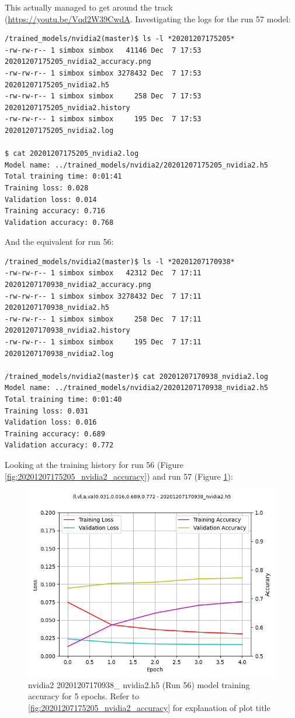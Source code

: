 This actually managed to get around the track (\url{https://youtu.be/Vqd2W39CwdA}.
Investigating the logs for the run 57 model:
\begin{verbatim}
/trained_models/nvidia2(master)$ ls -l *20201207175205*
-rw-rw-r-- 1 simbox simbox   41146 Dec  7 17:53 20201207175205_nvidia2_accuracy.png
-rw-rw-r-- 1 simbox simbox 3278432 Dec  7 17:53 20201207175205_nvidia2.h5
-rw-rw-r-- 1 simbox simbox     258 Dec  7 17:53 20201207175205_nvidia2.history
-rw-rw-r-- 1 simbox simbox     195 Dec  7 17:53 20201207175205_nvidia2.log

$ cat 20201207175205_nvidia2.log
Model name: ../trained_models/nvidia2/20201207175205_nvidia2.h5
Total training time: 0:01:41
Training loss: 0.028
Validation loss: 0.014
Training accuracy: 0.716
Validation accuracy: 0.768
\end{verbatim}
And the equivalent for run 56:
\begin{verbatim}
/trained_models/nvidia2(master)$ ls -l *20201207170938*
-rw-rw-r-- 1 simbox simbox   42312 Dec  7 17:11 20201207170938_nvidia2_accuracy.png
-rw-rw-r-- 1 simbox simbox 3278432 Dec  7 17:11 20201207170938_nvidia2.h5
-rw-rw-r-- 1 simbox simbox     258 Dec  7 17:11 20201207170938_nvidia2.history
-rw-rw-r-- 1 simbox simbox     195 Dec  7 17:11 20201207170938_nvidia2.log

/trained_models/nvidia2(master)$ cat 20201207170938_nvidia2.log
Model name: ../trained_models/nvidia2/20201207170938_nvidia2.h5
Total training time: 0:01:40
Training loss: 0.031
Validation loss: 0.016
Training accuracy: 0.689
Validation accuracy: 0.772
\end{verbatim}
Looking at the training history for run 56 (Figure \ref{fig:20201207175205_nvidia2_accuracy}) and run 57 (Figure \ref{fig:20201207170938_nvidia2_accuracy}):

\begin{figure}[ht]
 \centering 
 \includegraphics[width=\textwidth]{Figures/20201207170938_nvidia2_accuracy.png}
 \caption{nvidia2 20201207170938\_ nvidia2.h5 (Run 56) model training accuracy for 5 epochs. Refer to \ref{fig:20201207175205_nvidia2_accuracy} for explanation of plot title}
 \label{fig:20201207170938_nvidia2_accuracy} 
\end{figure}

